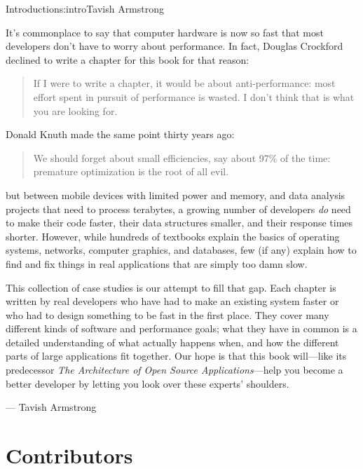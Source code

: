 \begin{aosachapter}{Introduction}{s:intro}{Tavish Armstrong}

It's commonplace to say that
computer hardware is now so fast
that most developers don't have to worry about performance. 
In fact,
Douglas Crockford declined to write a chapter for this book for that reason:

\begin{quote}
If I were to write a chapter, it would be about anti-performance:
most effort spent in pursuit of performance is wasted.
I don't think that is what you are looking for.
\end{quote}

\noindent
Donald Knuth made the same point thirty years ago:

\begin{quote}
We should forget about small efficiencies, say about 97\% of the time:
premature optimization is the root of all evil.
\end{quote}

\noindent
but between mobile devices with limited power and memory,
and data analysis projects that need to process terabytes,
a growing number of developers \emph{do} need to make their code faster,
their data structures smaller,
and their response times shorter.
However,
while hundreds of textbooks explain the basics of operating systems,
networks,
computer graphics,
and databases,
few (if any) explain how to find and fix things
in real applications
that are simply too damn slow.

This collection of case studies is our attempt to fill that gap.
Each chapter is written by real developers
who have had to make an existing system faster
or who had to design something to be fast in the first place.
They cover many different kinds of software and performance goals;
what they have in common is a detailed understanding of what actually happens when,
and how the different parts of large applications fit together.
Our hope is that this book will---like its predecessor \emph{The Architecture of Open Source Applications}---help
you become a better developer
by letting you look over these experts' shoulders.

\hspace{6cm} --- Tavish Armstrong

\section*{Contributors}


\end{aosachapter}
